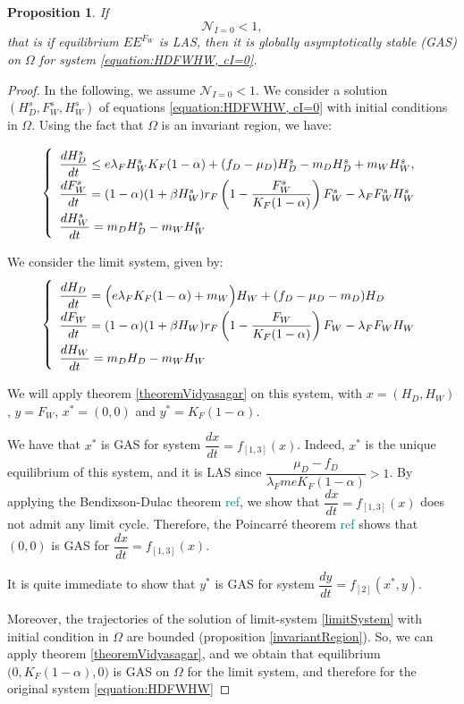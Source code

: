 \documentclass{article}
\newcommand{\lfw}{\lambda_{F}}
\newcommand{\lfw}{\lambda_{F}}
\newcommand{\marc}[1]{\textcolor{teal}{#1}}
\newtheorem{prop}{Proposition}
\begin{document}
\begin{prop}\label{propEEFGAS}If 
$$
\mathcal{N}_{I =0} < 1,
$$
that is if equilibrium $EE^{F_W}$ is LAS, then it is globally asymptotically stable (GAS) on $\Omega$ for system \eqref{equation:HDFWHW, cI=0}.
\end{prop}

\begin{proof}
In the following, we assume $ \mathcal{N}_{I =0} < 1$. We consider a solution $(H_D^s, F_W^s, H_W^s)$ of equations \eqref{equation:HDFWHW, cI=0} with initial conditions in $\Omega$. Using the fact that $\Omega$ is an invariant region, we have:

\begin{equation}
\def\arraystretch{2}
\left\{ \begin{array}{l}
\dfrac{dH^s_D}{dt} \leq e\lfw H^s_W K_F(1-\alpha) + (f_D - \mu_D) H^s_D - m_D H^s_D + m_W H^s_W , \\
\dfrac{dF^s_W}{dt} = (1-\alpha)(1 + \beta H_W^s) r_F \left(1 - \dfrac{F^s_W}{K_F(1-\alpha)} \right) F^s_W - \lfw F^s_W H^s_W \\
\dfrac{dH^s_W}{dt}= m_D H^s_D - m_W H^s_W 
\end{array} \right.
\end{equation}

We consider the limit system, given by:
\begin{equation}
\def\arraystretch{2}
\left\{ \begin{array}{l}
\dfrac{dH_D}{dt} = \Big(e\lfw K_F(1-\alpha) + m_W\Big)H_W + (f_D - \mu_D - m_D) H_D \\
\dfrac{dF_W}{dt} =(1-\alpha)(1 + \beta H_W) r_F \left(1 - \dfrac{F_W}{K_F(1-\alpha)} \right) F_W - \lfw F_W H_W \\
\dfrac{dH_W}{dt}= m_D H_D - m_W H_W 
\end{array} \right.
\label{limitSystem}
\end{equation}

We will apply theorem \ref{theoremVidyasagar} on this system, with $x = (H_D, H_W)$, $y = F_W$, $x^* = (0,0)$ and $y^* = K_F(1- \alpha)$.

We have that $x^*$ is GAS for system $\dfrac{dx}{dt} = f_{[1,3]}(x)$. Indeed, $x^*$ is the unique equilibrium of this system, and it is LAS since $\dfrac{\mu_D - f_D}{\lfw m e K_F(1-\alpha)} >1$. By applying the Bendixson-Dulac theorem \marc{ref}, we show that $\dfrac{dx}{dt} = f_{[1,3]}(x)$ does not admit any limit cycle. Therefore, the Poincarré theorem \marc{ref} shows that $(0, 0)$ is GAS for $\dfrac{dx}{dt} = f_{[1,3]}(x)$.

It is quite immediate to show that $y^*$ is GAS for system $\dfrac{dy}{dt} = f_{[2]}(x^*, y)$. 

Moreover, the trajectories of the solution of limit-system \eqref{limitSystem} with initial condition in $\Omega$ are bounded (proposition \ref{invariantRegion}). So, we can apply theorem \ref{theoremVidyasagar}, and we obtain that equilibrium $\Big(0, K_F(1-\alpha), 0 \Big)$ is GAS on $\Omega$ for the limit system, and therefore for the original system \eqref{equation:HDFWHW}


\end{proof}
\end{document}

